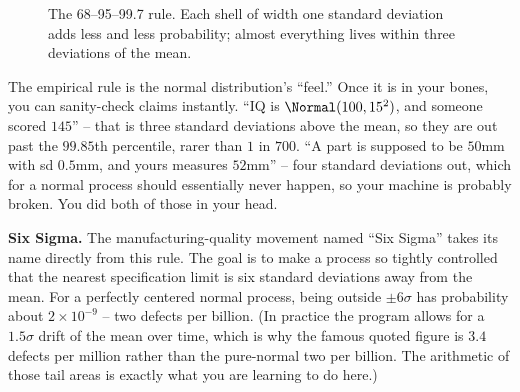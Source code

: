 \begin{figure}[H]
\centering
{}
\caption{The 68--95--99.7 rule. Each shell of width one standard deviation adds
less and less probability; almost everything lives within three deviations of the
mean.}
\label{ch12:fig-empirical}
\end{figure}

\begin{intuitionbox}
The empirical rule is the normal distribution's ``feel.'' Once it is in your
bones, you can sanity-check claims instantly. ``IQ is $\Normal(100, 15^2)$, and
someone scored $145$'' -- that is three standard deviations above the mean, so
they are out past the $99.85$th percentile, rarer than $1$ in $700$. ``A part is
supposed to be $50$mm with sd $0.5$mm, and yours measures $52$mm'' -- four
standard deviations out, which for a normal process should essentially never
happen, so your machine is probably broken. You did both of those in your head.
\end{intuitionbox}

\begin{applicationbox}
\textbf{Six Sigma.} The manufacturing-quality movement named ``Six Sigma'' takes
its name directly from this rule. The goal is to make a process so tightly
controlled that the nearest specification limit is six standard deviations away
from the mean. For a perfectly centered normal process, being outside
$\pm 6\sigma$ has probability about $2 \times 10^{-9}$ -- two defects per billion.
(In practice the program allows for a $1.5\sigma$ drift of the mean over time,
which is why the famous quoted figure is $3.4$ defects per million rather than
the pure-normal two per billion. The arithmetic of those tail areas is exactly
what you are learning to do here.)
\end{applicationbox}

